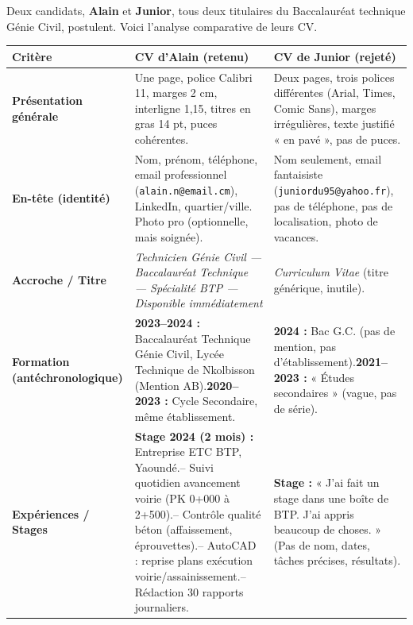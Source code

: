 \documentclass[11pt]{article}
\begin{document}
Deux candidats, \textbf{Alain} et \textbf{Junior}, tous deux titulaires du Baccalauréat technique Génie Civil, postulent. Voici l'analyse comparative de leurs CV.

\begin{popfigure}
\begin{center}
\begin{tabularx}{\linewidth}{|l|X|X|}\hline
\rowcolor{popblueL}
\textbf{Critère} & \textbf{CV d'Alain (retenu)} & \textbf{CV de Junior (rejeté)} \\ \hline
\textbf{Présentation générale} & Une page, police Calibri 11, marges 2 cm, interligne 1,15, titres en gras 14 pt, puces cohérentes. & Deux pages, trois polices différentes (Arial, Times, Comic Sans), marges irrégulières, texte justifié « en pavé », pas de puces. \\ \hline
\textbf{En-tête (identité)} & Nom, prénom, téléphone, email professionnel (\texttt{alain.n@email.cm}), LinkedIn, quartier/ville. Photo pro (optionnelle, mais soignée). & Nom seulement, email fantaisiste (\texttt{juniordu95@yahoo.fr}), pas de téléphone, pas de localisation, photo de vacances. \\ \hline
\textbf{Accroche / Titre} & \textit{Technicien Génie Civil — Baccalauréat Technique — Spécialité BTP — Disponible immédiatement} & \textit{Curriculum Vitae} (titre générique, inutile). \\ \hline
\textbf{Formation (antéchronologique)} & \textbf{2023--2024 :} Baccalauréat Technique Génie Civil, Lycée Technique de Nkolbisson (Mention AB).\newline \textbf{2020--2023 :} Cycle Secondaire, même établissement. & \textbf{2024 :} Bac G.C. (pas de mention, pas d'établissement).\newline \textbf{2021--2023 :} « Études secondaires » (vague, pas de série). \\ \hline
\textbf{Expériences / Stages} & \textbf{Stage 2024 (2 mois) :} Entreprise ETC BTP, Yaoundé.\newline -- Suivi quotidien avancement voirie (PK 0+000 à 2+500).\newline -- Contrôle qualité béton (affaissement, éprouvettes).\newline -- AutoCAD : reprise plans exécution voirie/assainissement.\newline -- Rédaction 30 rapports journaliers. & \textbf{Stage :} « J'ai fait un stage dans une boîte de BTP. J'ai appris beaucoup de choses. » (Pas de nom, dates, tâches précises, résultats). \\ \hline

\end{tabularx}
\end{center}
\end{popfigure}
\end{document}
